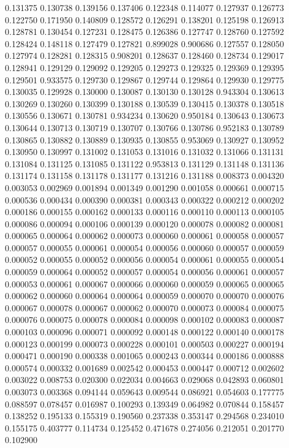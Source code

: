 0.131375
0.130738
0.139156
0.137406
0.122348
0.114077
0.127937
0.126773
0.122750
0.171950
0.140809
0.128572
0.126291
0.138201
0.125198
0.126913
0.128781
0.130454
0.127231
0.128475
0.126386
0.127747
0.128760
0.127592
0.128424
0.148118
0.127479
0.127821
0.899028
0.900686
0.127557
0.128050
0.127974
0.128281
0.128315
0.908201
0.128637
0.128460
0.128734
0.129017
0.128941
0.129129
0.129092
0.129205
0.129273
0.129325
0.129369
0.129395
0.129501
0.933575
0.129730
0.129867
0.129744
0.129864
0.129930
0.129775
0.130035
0.129928
0.130000
0.130087
0.130130
0.130128
0.943304
0.130613
0.130269
0.130260
0.130399
0.130188
0.130539
0.130415
0.130378
0.130518
0.130556
0.130671
0.130781
0.934234
0.130620
0.950184
0.130643
0.130673
0.130644
0.130713
0.130719
0.130707
0.130766
0.130786
0.952183
0.130789
0.130865
0.130882
0.130889
0.130935
0.130855
0.953069
0.130927
0.130952
0.130950
0.130997
0.131002
0.131053
0.131016
0.131032
0.131066
0.131131
0.131084
0.131125
0.131085
0.131122
0.953813
0.131129
0.131148
0.131136
0.131174
0.131158
0.131178
0.131177
0.131216
0.131188
0.008373
0.004320
0.003053
0.002969
0.001894
0.001349
0.001290
0.001058
0.000661
0.000715
0.000536
0.000434
0.000390
0.000381
0.000343
0.000322
0.000212
0.000202
0.000186
0.000155
0.000162
0.000133
0.000116
0.000110
0.000113
0.000105
0.000086
0.000094
0.000106
0.000139
0.000120
0.000078
0.000082
0.000081
0.000065
0.000064
0.000062
0.000073
0.000060
0.000061
0.000058
0.000057
0.000057
0.000055
0.000061
0.000054
0.000056
0.000060
0.000057
0.000059
0.000052
0.000055
0.000052
0.000056
0.000054
0.000061
0.000055
0.000054
0.000059
0.000064
0.000052
0.000057
0.000054
0.000056
0.000061
0.000057
0.000053
0.000061
0.000067
0.000066
0.000060
0.000059
0.000065
0.000065
0.000062
0.000060
0.000064
0.000064
0.000059
0.000070
0.000070
0.000076
0.000067
0.000078
0.000067
0.000062
0.000070
0.000073
0.000084
0.000075
0.000076
0.000075
0.000078
0.000084
0.000098
0.000102
0.000083
0.000087
0.000103
0.000096
0.000071
0.000092
0.000148
0.000122
0.000140
0.000178
0.000123
0.000199
0.000073
0.000228
0.000101
0.000503
0.000227
0.000194
0.000471
0.000190
0.000338
0.001065
0.000243
0.000344
0.000186
0.000888
0.000574
0.000332
0.001689
0.002542
0.000453
0.000447
0.000712
0.002602
0.003022
0.008753
0.020300
0.022034
0.004663
0.029068
0.042893
0.060801
0.003073
0.003368
0.094144
0.059643
0.009544
0.086921
0.054603
0.177775
0.088597
0.078457
0.016987
0.100293
0.139349
0.064982
0.070844
0.158457
0.138252
0.195133
0.155319
0.190560
0.237338
0.353147
0.294568
0.234010
0.155175
0.403777
0.114734
0.125452
0.471678
0.274056
0.212051
0.201770
0.102900
